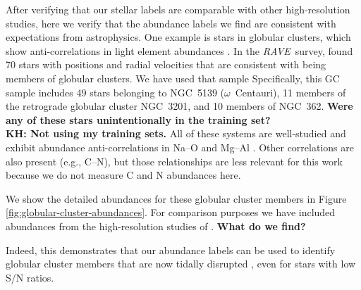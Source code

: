 \documentclass[preprint,trackchanges]{aastex}
\newcommand{\acronym}[1]{{\small{#1}}}
\newcommand{\project}[1]{\textsl{#1}}
\newcommand{\rave}{\project{\acronym{RAVE}}}
\newcommand{\stub}[1]{\textbf{#1}}
\begin{document}
After verifying that our stellar labels are comparable with other
high-resolution studies, here we verify that the abundance labels we find
are consistent with expectations from astrophysics.  One example is stars in
globular clusters, which show anti-correlations in light element abundances 
\citep[e.g.,][and references therein]{Da_Costa,Carretta_2009}. In the \rave\
survey, \cite{Anguiano_2015} found 70 stars with positions and radial velocities that are
consistent with being members of globular clusters.  We have used that sample
Specifically, this GC sample includes 49 stars belonging to NGC~5139 ($\omega$~Centauri), 11 members of the retrograde
globular cluster NGC~3201, and 10 members of NGC~362.  
\stub{Were any of these stars unintentionally in the training set? \\ KH: Not using my training sets.}
All of these systems are well-studied and exhibit abundance anti-correlations 
in Na--O and Mg--Al \citep{people}.  Other correlations are also present 
(e.g., C--N), but those relationships are less relevant for this work because 
we do not measure C and N abundances here.


We show the detailed abundances for these globular cluster members in
Figure \ref{fig:globular-cluster-abundances}.  For comparison purposes we
have included abundances from the high-resolution studies of \citep{people}.
\stub{What do we find?}

Indeed, this demonstrates that our abundance labels can be used to identify
globular cluster members that are now tidally disrupted \citep{Anguiano_2016,Kuzma_2016,Navin_2016},
even for stars with low S/N ratios.




\end{document}
